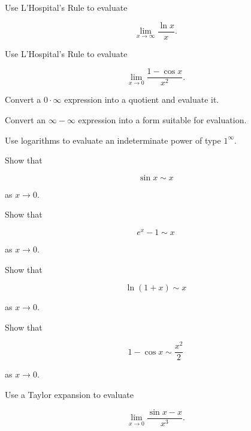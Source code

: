 \begin{exercise}[3]
Use L'Hospital's Rule to evaluate

\[
\lim_{x\to\infty}
\frac{\ln x}{x}.
\]
\end{exercise}

\begin{exercise}[3]
Use L'Hospital's Rule to evaluate

\[
\lim_{x\to0}
\frac{1-\cos x}{x^2}.
\]
\end{exercise}

\begin{exercise}[3]
Convert a \(0\cdot\infty\) expression into a quotient and evaluate it.
\end{exercise}

\begin{exercise}[3]
Convert an \(\infty-\infty\) expression into a form suitable for evaluation.
\end{exercise}

\begin{exercise}[3]
Use logarithms to evaluate an indeterminate power of type \(1^\infty\).
\end{exercise}

\begin{exercise}[3]
Show that

\[
\sin x\sim x
\]

as \(x\to0\).
\end{exercise}

\begin{exercise}[3]
Show that

\[
e^x-1\sim x
\]

as \(x\to0\).
\end{exercise}

\begin{exercise}[3]
Show that

\[
\ln(1+x)\sim x
\]

as \(x\to0\).
\end{exercise}

\begin{exercise}[3]
Show that

\[
1-\cos x
\sim
\frac{x^2}{2}
\]

as \(x\to0\).
\end{exercise}

\begin{exercise}[3]
Use a Taylor expansion to evaluate

\[
\lim_{x\to0}
\frac{
\sin x-x
}{
x^3
}.
\]
\end{exercise}

